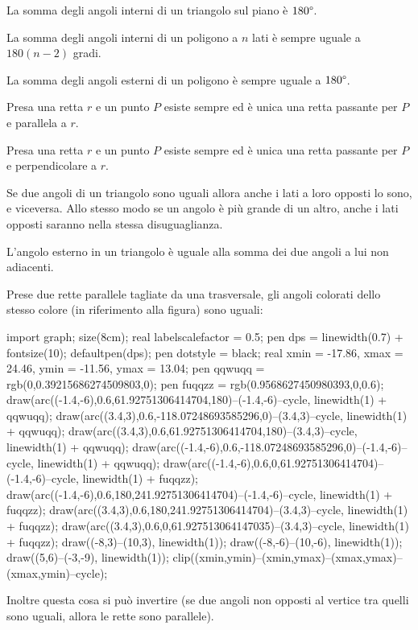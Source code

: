 \documentclass[11pt]{scrartcl}
\begin{document}
	\begin{fact}
		La somma degli angoli interni di un triangolo sul piano è $180 \degree$.
	\end{fact}
	\begin{fact}
		La somma degli angoli interni di un poligono a $n$ lati è sempre uguale a $180(n-2)$ gradi.
	\end{fact}
	\begin{fact}
		La somma degli angoli esterni di un poligono è sempre uguale a $180 \degree$.
	\end{fact}
	\begin{fact}
		Presa una retta $r$ e un punto $P$ esiste sempre ed è unica una retta passante per $P$ e parallela a $r$.
	\end{fact}
	\begin{fact}
		Presa una retta $r$ e un punto $P$ esiste sempre ed è unica una retta passante per $P$ e perpendicolare a $r$.
	\end{fact}
	\begin{fact}
		Se due angoli di un triangolo sono uguali allora anche i lati a loro opposti lo sono, e viceversa. Allo stesso modo se un angolo è più grande di un altro, anche i lati opposti saranno nella stessa disuguaglianza.
	\end{fact}
	\begin{fact}
		L'angolo esterno in un triangolo è uguale alla somma dei due angoli a lui non adiacenti.
	\end{fact}
	\begin{fact}
		Prese due rette parallele tagliate da una trasversale, gli angoli colorati dello stesso colore (in riferimento alla figura) sono uguali:
		\begin{center}
			\begin{asy}
				import graph; size(8cm); 
				real labelscalefactor = 0.5; 
				pen dps = linewidth(0.7) + fontsize(10); defaultpen(dps); 
				pen dotstyle = black; 
				real xmin = -17.86, xmax = 24.46, ymin = -11.56, ymax = 13.04;  
				pen qqwuqq = rgb(0,0.39215686274509803,0); pen fuqqzz = rgb(0.9568627450980393,0,0.6); 
				draw(arc((-1.4,-6),0.6,61.92751306414704,180)--(-1.4,-6)--cycle, linewidth(1) + qqwuqq); 
				draw(arc((3.4,3),0.6,-118.07248693585296,0)--(3.4,3)--cycle, linewidth(1) + qqwuqq); 
				draw(arc((3.4,3),0.6,61.92751306414704,180)--(3.4,3)--cycle, linewidth(1) + qqwuqq); 
				draw(arc((-1.4,-6),0.6,-118.07248693585296,0)--(-1.4,-6)--cycle, linewidth(1) + qqwuqq); 
				draw(arc((-1.4,-6),0.6,0,61.92751306414704)--(-1.4,-6)--cycle, linewidth(1) + fuqqzz); 
				draw(arc((-1.4,-6),0.6,180,241.92751306414704)--(-1.4,-6)--cycle, linewidth(1) + fuqqzz); 
				draw(arc((3.4,3),0.6,180,241.92751306414704)--(3.4,3)--cycle, linewidth(1) + fuqqzz); 
				draw(arc((3.4,3),0.6,0,61.927513064147035)--(3.4,3)--cycle, linewidth(1) + fuqqzz); 
				draw((-8,3)--(10,3), linewidth(1)); 
				draw((-8,-6)--(10,-6), linewidth(1)); 
				draw((5,6)--(-3,-9), linewidth(1));
				clip((xmin,ymin)--(xmin,ymax)--(xmax,ymax)--(xmax,ymin)--cycle);
			\end{asy}
		\end{center}
		Inoltre questa cosa si può invertire (se due angoli non opposti al vertice tra quelli sono uguali, allora le rette sono parallele).
	\end{fact}
\end{document}
